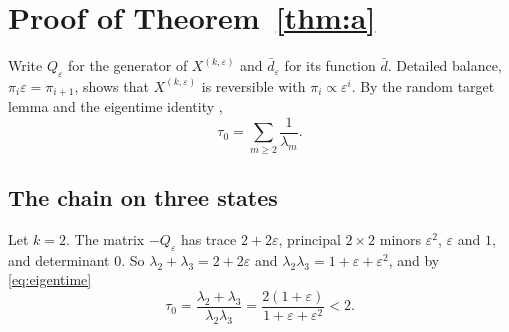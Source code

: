 \documentclass[11pt]{amsart}
\numberwithin{equation}{section}
\newcommand{\dbar}{\bar d}
\begin{document}
\section{Proof of Theorem~\ref{thm:a}}\label{sec:a}

Write $Q_\varepsilon$ for the generator of $X^{(k,\varepsilon)}$ and $\dbar_\varepsilon$ for its function $\dbar$. Detailed balance, $\pi_i\varepsilon=\pi_{i+1}$, shows that $X^{(k,\varepsilon)}$ is reversible with $\pi_i\propto\varepsilon^i$. By the random target lemma and the eigentime identity \cite[Proposition~3.13]{AF},
\begin{equation}\label{eq:eigentime}
\tau_0=\sum_{m\ge2}\frac1{\lambda_m}.
\end{equation}

\subsection{The chain on three states}
Let $k=2$. The matrix $-Q_\varepsilon$ has trace $2+2\varepsilon$, principal $2\times2$ minors $\varepsilon^2$, $\varepsilon$ and $1$, and determinant $0$. So $\lambda_2+\lambda_3=2+2\varepsilon$ and $\lambda_2\lambda_3=1+\varepsilon+\varepsilon^2$, and by \eqref{eq:eigentime}
\[
\tau_0=\frac{\lambda_2+\lambda_3}{\lambda_2\lambda_3}=\frac{2(1+\varepsilon)}{1+\varepsilon+\varepsilon^2}<2.
\]
\end{document}
